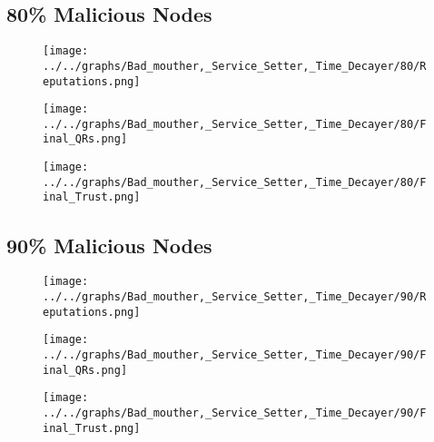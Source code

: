 \begin{minipage}[t]{0.49\columnwidth}
\subsection*{80\% Malicious Nodes}
    \begin{figure}[H]
        \centering
        \texttt{[image: ../../graphs/Bad\_mouther,\_Service\_Setter,\_Time\_Decayer/80/Reputations.png]}
    \end{figure}
    \begin{figure}[H]
        \centering
        \texttt{[image: ../../graphs/Bad\_mouther,\_Service\_Setter,\_Time\_Decayer/80/Final\_QRs.png]}
    \end{figure}
\end{minipage}
\begin{minipage}[t]{0.49\columnwidth}
    \begin{figure}[H]
        \centering
        \texttt{[image: ../../graphs/Bad\_mouther,\_Service\_Setter,\_Time\_Decayer/80/Final\_Trust.png]}
    \end{figure}
\end{minipage}

\begin{minipage}[t]{0.49\columnwidth}
\subsection*{90\% Malicious Nodes}
    \begin{figure}[H]
        \centering
        \texttt{[image: ../../graphs/Bad\_mouther,\_Service\_Setter,\_Time\_Decayer/90/Reputations.png]}
    \end{figure}
    \begin{figure}[H]
        \centering
        \texttt{[image: ../../graphs/Bad\_mouther,\_Service\_Setter,\_Time\_Decayer/90/Final\_QRs.png]}
    \end{figure}
\end{minipage}
\begin{minipage}[t]{0.49\columnwidth}
    \begin{figure}[H]
        \centering
        \texttt{[image: ../../graphs/Bad\_mouther,\_Service\_Setter,\_Time\_Decayer/90/Final\_Trust.png]}
    \end{figure}
\end{minipage}
\newpage

